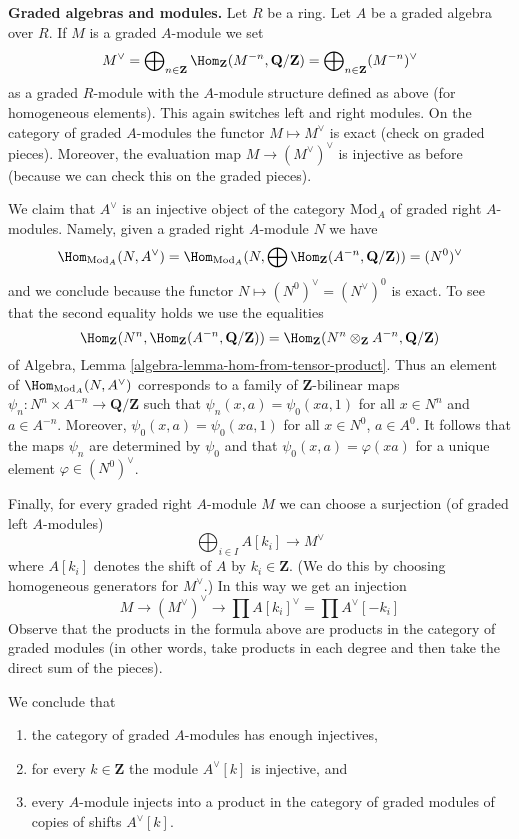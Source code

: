 \medskip\noindent
{\bf Graded algebras and modules.}
Let $R$ be a ring. Let $A$ be a graded algebra over $R$.
If $M$ is a graded $A$-module we set
$$
M^\vee =
\bigoplus\nolimits_{n \in \mathbf{Z}}
\Hom_\mathbf{Z}(M^{-n}, \mathbf{Q}/\mathbf{Z}) =
\bigoplus\nolimits_{n \in \mathbf{Z}} (M^{-n})^\vee
$$
as a graded $R$-module with the $A$-module structure defined as above
(for homogeneous elements). This again switches left and right modules.
On the category of graded $A$-modules the functor $M \mapsto M^\vee$
is exact (check on graded pieces). Moreover, the evaluation map
$M \to (M^\vee)^\vee$ is injective as before (because we can check
this on the graded pieces).

\medskip\noindent
We claim that $A^\vee$ is an injective object of the category
$\text{Mod}_A$ of graded right $A$-modules. Namely, given a graded
right $A$-module $N$ we have
$$
\Hom_{\text{Mod}_A}(N, A^\vee) =
\Hom_{\text{Mod}_A}(
N, \bigoplus \Hom_\mathbf{Z}(A^{-n}, \mathbf{Q}/\mathbf{Z})) = (N^0)^\vee
$$
and we conclude because the functor $N \mapsto (N^0)^\vee = (N^\vee)^0$
is exact. To see that the second equality holds we use the equalities
$$
\Hom_\mathbf{Z}(N^n, \Hom_\mathbf{Z}(A^{-n}, \mathbf{Q}/\mathbf{Z})) =
\Hom_\mathbf{Z}(N^n \otimes_\mathbf{Z} A^{-n}, \mathbf{Q}/\mathbf{Z})
$$
of Algebra, Lemma \ref{algebra-lemma-hom-from-tensor-product}.
Thus an element of $\Hom_{\text{Mod}_A}(N, A^\vee)$ corresponds
to a family of $\mathbf{Z}$-bilinear maps
$\psi_n : N^n \times A^{-n} \to \mathbf{Q}/\mathbf{Z}$ such that
$\psi_n(x, a) = \psi_0(xa, 1)$ for all $x \in N^n$ and $a \in A^{-n}$.
Moreover, $\psi_0(x, a) = \psi_0(xa, 1)$ for all $x \in N^0$, $a \in A^0$.
It follows that the maps $\psi_n$ are determined by $\psi_0$ and that
$\psi_0(x, a) = \varphi(xa)$ for a unique element $\varphi \in (N^0)^\vee$.

\medskip\noindent
Finally, for every graded right $A$-module $M$ we can choose a surjection
(of graded left $A$-modules)
$$
\bigoplus\nolimits_{i \in I} A[k_i] \to M^\vee
$$
where $A[k_i]$ denotes the shift of $A$ by $k_i \in \mathbf{Z}$.
(We do this by choosing homogeneous generators for $M^\vee$.)
In this way we get an injection
$$
M \to (M^\vee)^\vee \to \prod A[k_i]^\vee = \prod A^\vee[-k_i]
$$
Observe that the products in the formula above are products in the
category of graded modules (in other words, take products in each degree
and then take the direct sum of the pieces).

\medskip\noindent
We conclude that
\begin{enumerate}
\item the category of graded $A$-modules has enough injectives,
\item for every $k \in \mathbf{Z}$ the module $A^\vee[k]$ is injective, and
\item every $A$-module injects into a product in the category of graded
modules of copies of shifts $A^\vee[k]$.
\end{enumerate}

